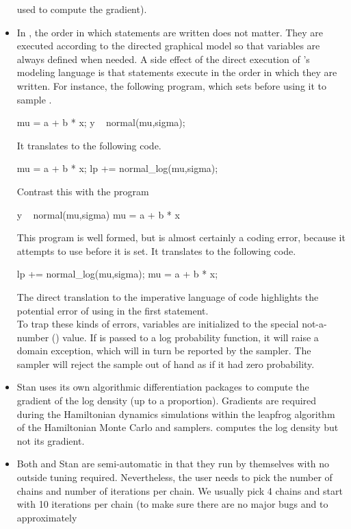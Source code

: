 \begin{itemize}
  used to compute the gradient).
\item In \BUGS, the order in which statements are written does not
  matter.  They are executed according to the directed graphical model
  so that variables are always defined when needed.  A side effect of
  the direct execution of \Stan's modeling language is that statements
  execute in the order in which they are written.  For instance, the
  following \Stan program, which sets  before using it to
  sample .
%
\begin{stancode}
mu = a + b * x;
y ~ normal(mu,sigma);
\end{stancode}
%
It translates to the following \Cpp code.
%
\begin{stancode}
mu = a + b * x; 
lp += normal_log(mu,sigma);
\end{stancode}
%
Contrast this with the \Stan program
%
\begin{stancode}
y ~ normal(mu,sigma)
mu = a + b * x
\end{stancode}
%
This program is well formed, but is almost certainly  
a coding error, because it attempts to use  before 
it is set. It translates to the following \Cpp code.
%
\begin{stancode}
lp += normal_log(mu,sigma);
mu = a + b * x;
\end{stancode}
%
The direct translation to the imperative language of \Cpp code
highlights the potential error of using  in the first
statement.
\\[8pt]
To trap these kinds of errors, variables are initialized to the
special not-a-number () value.  If  is passed to a
log probability function, it will raise a domain exception, which will
in turn be reported by the sampler.  The sampler will reject the
sample out of hand as if it had zero probability.
%
\item Stan uses its own \Cpp algorithmic differentiation packages to
  compute the gradient of the log density (up to a proportion).
  Gradients are required during the Hamiltonian dynamics simulations
  within the leapfrog algorithm of the Hamiltonian Monte Carlo and
  \NUTS samplers.  \BUGS computes the log density but not its
  gradient.
\item Both \BUGS and Stan are semi-automatic in that they run by
  themselves with no outside tuning required. Nevertheless, the user
  needs to pick the number of chains and number of iterations per
  chain.  We usually pick 4 chains and start with 10 iterations per
  chain (to make sure there are no major bugs and to approximately

\end{itemize}
